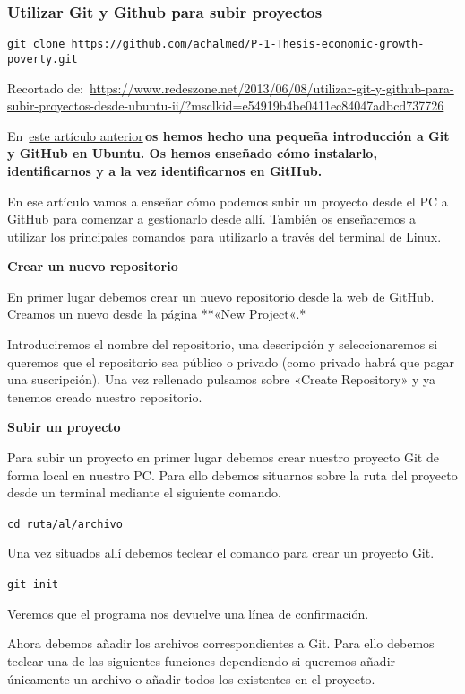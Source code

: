 \documentclass[
  a2paper,
]{article}
\begin{document}
\hypertarget{utilizar-git-y-github-para-subir-proyectos}{%
\subsubsection{Utilizar Git y Github para subir
proyectos}\label{utilizar-git-y-github-para-subir-proyectos}}

\texttt{git\ clone~https://github.com/achalmed/P-1-Thesis-economic-growth-poverty.git}

Recortado
de:~\url{https://www.redeszone.net/2013/06/08/utilizar-git-y-github-para-subir-proyectos-desde-ubuntu-ii/?msclkid=e54919b4be0411ec84047adbcd737726}

En~\href{https://www.redeszone.net/2013/06/07/utilizar-git-y-github-desde-ubuntu-i/}{este
artículo anterior}\,\textbf{os hemos hecho una pequeña introducción a
Git y GitHub en Ubuntu. Os hemos enseñado cómo instalarlo,
identificarnos y a la vez identificarnos en GitHub.}

En ese artículo vamos a enseñar cómo podemos subir un proyecto desde el
PC a GitHub para comenzar a gestionarlo desde allí. También os
enseñaremos a utilizar los principales comandos para utilizarlo a través
del terminal de Linux.

\textbf{Crear un nuevo repositorio}

En primer lugar debemos crear un nuevo repositorio desde la web de
GitHub. Creamos un nuevo desde la página **«New Project«.*

Introduciremos el nombre del repositorio, una descripción y
seleccionaremos si queremos que el repositorio sea público o privado
(como privado habrá que pagar una suscripción). Una vez rellenado
pulsamos sobre «Create Repository» y ya tenemos creado nuestro
repositorio.

\textbf{Subir un proyecto}

Para subir un proyecto en primer lugar debemos crear nuestro proyecto
Git de forma local en nuestro PC. Para ello debemos situarnos sobre la
ruta del proyecto desde un terminal mediante el siguiente comando.

\texttt{cd\ ruta/al/archivo}~~

Una vez situados allí debemos teclear el comando para crear un proyecto
Git.

\texttt{git\ init}~~

Veremos que el programa nos devuelve una línea de confirmación.

Ahora debemos añadir los archivos correspondientes a Git. Para ello
debemos teclear una de las siguientes funciones dependiendo si queremos
añadir únicamente un archivo o añadir todos los existentes en el
proyecto.
\end{document}
